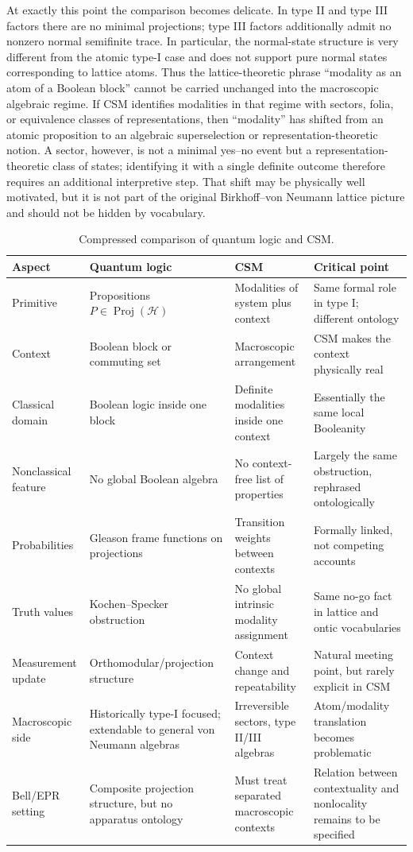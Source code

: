 \documentclass[
aps,
pra,
reprint,
superscriptaddress,
nofootinbib,
longbibliography
]{revtex4-2}
\newcommand{\Hilb}{\mathcal H}
\newcommand{\Proj}{\operatorname{Proj}}
\begin{document}
At exactly this point the comparison becomes delicate.  In type II and type III
factors there are no minimal projections; type III factors additionally admit
no nonzero normal semifinite trace. In particular, the normal-state structure
is very different from the atomic type-I case and does not support pure normal
states corresponding to lattice atoms.  Thus the lattice-theoretic phrase
``modality as an atom of a Boolean block'' cannot be carried unchanged into
the macroscopic algebraic regime.  If CSM identifies modalities in that regime
with sectors, folia, or equivalence classes of representations, then
``modality'' has shifted from an atomic proposition to an algebraic
superselection or representation-theoretic notion.  A sector, however, is not a
minimal yes--no event but a representation-theoretic class of states;
identifying it with a single definite outcome therefore requires an additional
interpretive step.  That shift may be physically well motivated, but it is not
part of the original Birkhoff--von Neumann lattice picture and should not be
hidden by vocabulary.

\begin{table}
\caption{Compressed comparison of quantum logic and CSM.}
\label{tab:csm-ql}
\begin{tabular}{p{}p{}p{}p{}}
\hline\hline
Aspect & Quantum logic & CSM & Critical point \tabularnewline
\hline
Primitive & Propositions $P\in\Proj(\Hilb)$ & Modalities of system plus context & Same formal role in type I; different ontology \tabularnewline
Context & Boolean block or commuting set & Macroscopic arrangement & CSM makes the context physically real \tabularnewline
Classical domain & Boolean logic inside one block & Definite modalities inside one context & Essentially the same local Booleanity \tabularnewline
Nonclassical feature & No global Boolean algebra & No context-free list of properties & Largely the same obstruction, rephrased ontologically \tabularnewline
Probabilities & Gleason frame functions on projections & Transition weights between contexts & Formally linked, not competing accounts \tabularnewline
Truth values & Kochen--Specker obstruction & No global intrinsic modality assignment & Same no-go fact in lattice and ontic vocabularies \tabularnewline
Measurement update & Orthomodular/projection structure & Context change and repeatability & Natural meeting point, but rarely explicit in CSM \tabularnewline
Macroscopic side & Historically type-I focused; extendable to general von Neumann algebras & Irreversible sectors, type II/III algebras & Atom/modality translation becomes problematic \tabularnewline
Bell/EPR setting & Composite projection structure, but no apparatus ontology & Must treat separated macroscopic contexts & Relation between contextuality and nonlocality remains to be specified \tabularnewline
\hline\hline
\end{tabular}
\end{table}
\end{document}
